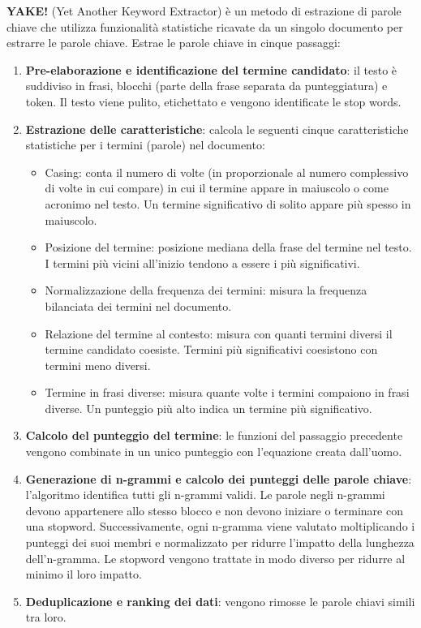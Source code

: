 \textbf{YAKE!} (Yet Another Keyword Extractor) è un metodo di estrazione di parole chiave che utilizza funzionalità statistiche ricavate da un singolo documento per estrarre le parole chiave. Estrae le parole chiave in cinque passaggi:
\begin{enumerate}
\item \textbf{Pre-elaborazione e identificazione del termine candidato}: il testo è suddiviso in frasi, blocchi (parte della frase separata da punteggiatura) e token. Il testo viene pulito, etichettato e vengono identificate le stop words.
\item \textbf{Estrazione delle caratteristiche}: calcola le seguenti cinque caratteristiche statistiche per i termini (parole) nel documento:
\begin{itemize}
\item Casing: conta il numero di volte (in proporzionale al numero complessivo di volte in cui compare) in cui il termine appare in maiuscolo o come acronimo nel testo. Un termine significativo di solito appare più spesso in maiuscolo.
\item Posizione del termine: posizione mediana della frase del termine nel testo. I termini più vicini all'inizio tendono a essere i più significativi.
\item Normalizzazione della frequenza dei termini: misura la frequenza bilanciata dei termini nel documento.
\item Relazione del termine al contesto: misura con quanti termini diversi il termine candidato coesiste. Termini più significativi coesistono con termini meno diversi. 
\item Termine in frasi diverse: misura quante volte i termini compaiono in frasi diverse. Un punteggio più alto indica un termine più significativo.
\end{itemize}
\item \textbf{Calcolo del punteggio del termine}: le funzioni del passaggio precedente vengono combinate in un unico punteggio con l'equazione creata dall'uomo.
\item \textbf{Generazione di n-grammi e calcolo dei punteggi delle parole chiave}: l'algoritmo identifica tutti gli n-grammi validi. Le parole negli n-grammi devono appartenere allo stesso blocco e non devono iniziare o terminare con una stopword. Successivamente, ogni n-gramma viene valutato moltiplicando i punteggi dei suoi membri e normalizzato per ridurre l'impatto della lunghezza dell'n-gramma. Le stopword vengono trattate in modo diverso per ridurre al minimo il loro impatto.
\item \textbf{Deduplicazione e ranking dei dati}: vengono rimosse le parole chiavi simili tra loro.
\end{enumerate}

